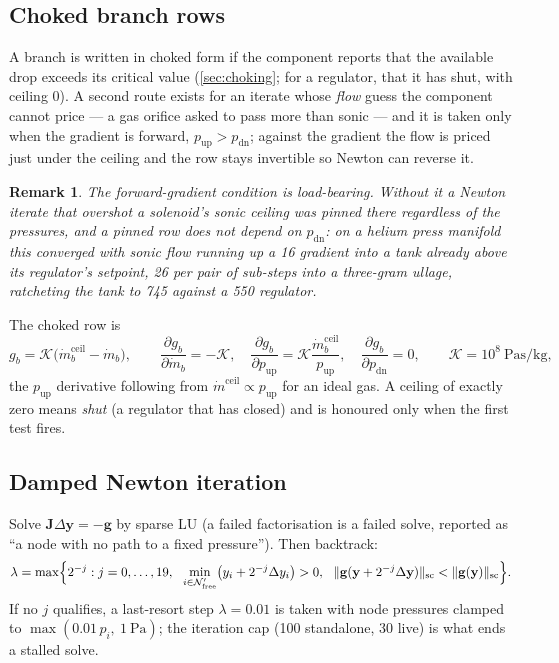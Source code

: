 \documentclass[11pt,a4paper]{article}
\newtheorem{remark}{Remark}
\newcommand{\mdot}{\dot{m}}
\newcommand{\dd}[2]{\frac{\partial #1}{\partial #2}}
\newcommand{\Nfree}{\mathcal{N}_{\mathrm{free}}}
\begin{document}
\subsection{Choked branch rows}\label{sec:chokedrow}
A branch is written in choked form if the component reports that the
available drop exceeds its critical value (\cref{sec:choking}; for a regulator,
that it has shut, with ceiling $0$). A second route exists for an iterate whose
\emph{flow} guess the component cannot price --- a gas orifice asked to pass
more than sonic --- and it is taken only when the gradient is forward,
$p_{\mathrm{up}}>p_{\mathrm{dn}}$; against the gradient the flow is priced just
under the ceiling and the row stays invertible so Newton can reverse it.
\begin{remark}
The forward-gradient condition is load-bearing. Without it a Newton iterate
that overshot a solenoid's sonic ceiling was pinned there regardless of the
pressures, and a pinned row does not depend on $p_{\mathrm{dn}}$: on a helium
press manifold this converged with sonic flow running \emph{up} a
\SI{16}{\psi} gradient into a tank already above its regulator's setpoint,
\SI{26}{\psi} per pair of sub-steps into a three-gram ullage, ratcheting the
tank to \SI{745}{\psig} against a \SI{550}{\psig} regulator.
\end{remark}
The choked row is
\begin{equation}
  g_b = \mathcal{K}\bigl(\mdot^{\mathrm{ceil}}_b - \mdot_b\bigr),\qquad
  \dd{g_b}{\mdot_b} = -\mathcal{K},\quad
  \dd{g_b}{p_{\mathrm{up}}} = \mathcal{K}\frac{\mdot^{\mathrm{ceil}}_b}{p_{\mathrm{up}}},\quad
  \dd{g_b}{p_{\mathrm{dn}}} = 0,
  \qquad \mathcal{K}=10^{8}\ \si{\pascal\second\per\kilogram},
  \label{eq:chokerow}
\end{equation}
the $p_{\mathrm{up}}$ derivative following from $\mdot^{\mathrm{ceil}}\propto p_{\mathrm{up}}$
for an ideal gas. A ceiling of exactly zero means \emph{shut} (a regulator that
has closed) and is honoured only when the first test fires.

\subsection{Damped Newton iteration}
Solve $\mathbf{J}\Delta\mathbf{y} = -\mathbf{g}$ by sparse LU (a failed
factorisation is a failed solve, reported as ``a node with no path to a fixed
pressure''). Then backtrack:
\begin{equation}
  \lambda = \max\Bigl\{2^{-j}: j=0,\dots,19,\ \
    \min_{i\in\Nfree'}\bigl(y_i + 2^{-j}\Delta y_i\bigr) > 0,\ \
    \|\mathbf{g}(\mathbf{y}+2^{-j}\Delta\mathbf{y})\|_{\mathrm{sc}} < \|\mathbf{g}(\mathbf{y})\|_{\mathrm{sc}}\Bigr\}.
\end{equation}
If no $j$ qualifies, a last-resort step $\lambda=0.01$ is taken with node
pressures clamped to $\max(0.01\,p_i,\ \SI{1}{\pascal})$; the iteration cap
(100 standalone, 30 live) is what ends a stalled solve.
\end{document}
